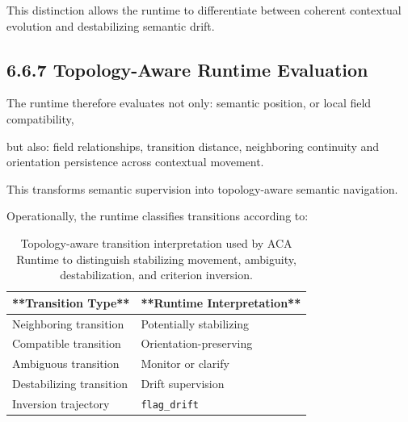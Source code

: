 \documentclass[11pt]{article}
\begin{document}
This distinction allows the runtime to differentiate between coherent contextual evolution and destabilizing semantic drift.

\subsection{6.6.7 Topology-Aware Runtime Evaluation}

The runtime therefore evaluates not only: semantic position, or local field compatibility,

but also: field relationships, transition distance, neighboring continuity and orientation persistence across contextual movement.

This transforms semantic supervision into topology-aware semantic navigation.

Operationally, the runtime classifies transitions according to:

\begin{table}[h]

\centering

\begin{tabular}{ll}

\hline

**Transition Type** & **Runtime Interpretation** \\

\hline

Neighboring transition & Potentially stabilizing \\

Compatible transition & Orientation-preserving \\

Ambiguous transition & Monitor or clarify \\

Destabilizing transition & Drift supervision \\

Inversion trajectory & \texttt{flag\_drift} \\

\hline

\end{tabular}

\caption{Topology-aware transition interpretation used by ACA Runtime to distinguish stabilizing movement, ambiguity, destabilization, and criterion inversion.}

\label{tab:topology-aware-transition-interpretation}

\end{table}
\end{document}
